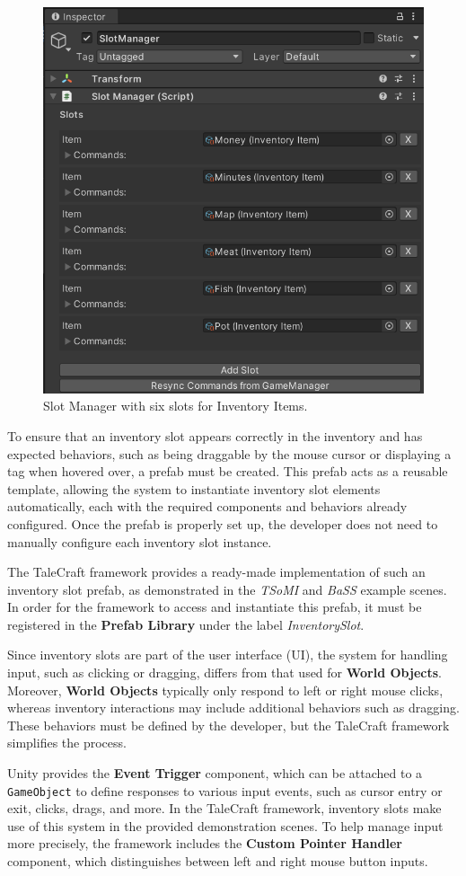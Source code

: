\begin{figure}[H]
\centering
\includegraphics[width=.7\linewidth]{img/image_2025-07-05_133040354.png}
\caption{Slot Manager with six slots for Inventory Items.}
\label{fig:Manual-SM}
\end{figure}

To ensure that an inventory slot appears correctly in the inventory and has expected behaviors, such as being draggable by the mouse cursor or displaying a tag when hovered over, a prefab must be created. This prefab acts as a reusable template, allowing the system to instantiate inventory slot elements automatically, each with the required components and behaviors already configured. Once the prefab is properly set up, the developer does not need to manually configure each inventory slot instance.

The TaleCraft framework provides a ready-made implementation of such an inventory slot prefab, as demonstrated in the \textit{TSoMI} and \textit{BaSS} example scenes. In order for the framework to access and instantiate this prefab, it must be registered in the \textbf{Prefab Library} under the label \textit{InventorySlot}.

Since inventory slots are part of the user interface (UI), the system for handling input, such as clicking or dragging, differs from that used for \textbf{World Objects}. Moreover, \textbf{World Objects} typically only respond to left or right mouse clicks, whereas inventory interactions may include additional behaviors such as dragging. These behaviors must be defined by the developer, but the TaleCraft framework simplifies the process.

Unity provides the \textbf{Event Trigger} component, which can be attached to a \verb|GameObject| to define responses to various input events, such as cursor entry or exit, clicks, drags, and more. In the TaleCraft framework, inventory slots make use of this system in the provided demonstration scenes. To help manage input more precisely, the framework includes the \textbf{Custom Pointer Handler} component, which distinguishes between left and right mouse button inputs.

